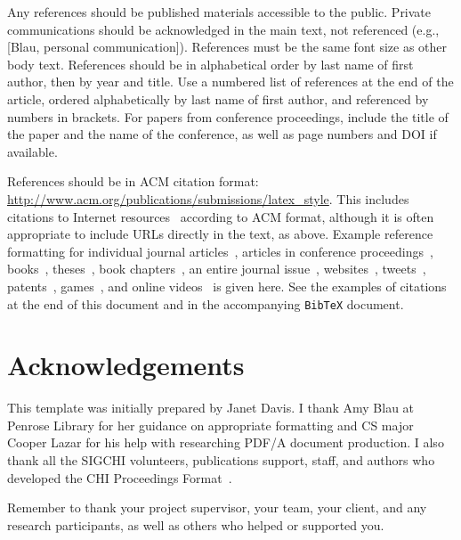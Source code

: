 \documentclass{article}
\begin{document}
Any references should be published materials accessible to the
public. Private communications
should be acknowledged in the main text, not referenced (e.g.,
[Blau, personal communication]). References must be the same
font size as other body text. References should be in alphabetical
order by last name of first author, then by year and title. Use a numbered list of references
at the end of the article, ordered alphabetically by last name of
first author, and referenced by numbers in brackets. For papers from
conference proceedings, include the title of the paper and the name of
the conference, as well as page numbers and DOI if available.

References should be in ACM citation format:
\url{http://www.acm.org/publications/submissions/latex_style}.  This
includes citations to Internet
resources~\cite{cavender:writing,CHI,CHINOSAUR:venue,OED:they,psy:gangnam}
according to ACM format, although it is often appropriate to include
URLs directly in the text, as above. Example reference formatting for
individual journal articles~\cite{ethics}, articles in conference
proceedings~\cite{Klemmer:2002:WSC:503376.503378},
books~\cite{Schwartz:1995:GBF}, theses~\cite{sutherland:sketchpad},
book chapters~\cite{winner:politics}, an entire journal
issue~\cite{kaye:puc},
websites~\cite{acm_categories,cavender:writing},
tweets~\cite{CHINOSAUR:venue}, patents~\cite{heilig:sensorama}, 
games~\cite{supermetroid:snes}, and
online videos~\cite{psy:gangnam} is given here.  See the examples of
citations at the end of this document and in the accompanying
\texttt{BibTeX} document.

\section{Acknowledgements}
This template was initially prepared by Janet Davis.
I thank Amy Blau at Penrose Library for her guidance on appropriate formatting and  CS major Cooper Lazar for his help with researching PDF/A document production. I also thank all the SIGCHI volunteers, publications support, staff, and authors
who developed the CHI Proceedings Format~\cite{CHI}. 

Remember to thank your project supervisor, your team, your client, and any research participants, as well as others who helped or supported you.

\printbibliography
\end{document}
